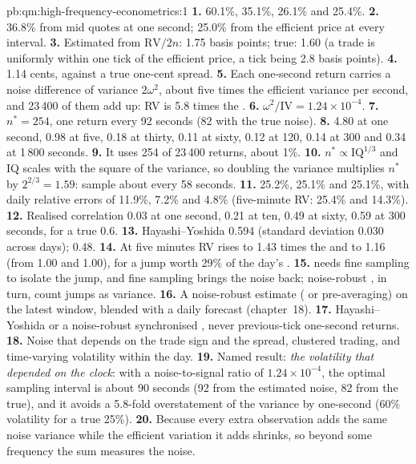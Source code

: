 \begin{solution}{pb:qm:high-frequency-econometrics:1}
\textbf{1.} 60.1\%, 35.1\%, 26.1\% and 25.4\%.
\textbf{2.} 36.8\% from mid quotes at one second; 25.0\% from the efficient price at every interval.
\textbf{3.} Estimated from $\mathrm{RV}/2n$: 1.75 basis points; true: 1.60 (a trade is uniformly within one tick of the efficient price, a tick being 2.8 basis points).
\textbf{4.} 1.14 cents, against a true one-cent spread.
\textbf{5.} Each one-second return carries a noise difference of variance $2\omega^2$, about five times the efficient variance per second, and 23\,400 of them add up: RV is 5.8 times
the .
\textbf{6.} $\omega^2/\mathrm{IV} = 1.24 \times 10^{-4}$.
\textbf{7.} $n^* = 254$, one return every 92 seconds (82 with the true noise).
\textbf{8.} 4.80 at one second, 0.98 at five, 0.18 at thirty, 0.11 at sixty, 0.12 at 120, 0.14 at 300 and 0.34 at 1\,800 seconds.
\textbf{9.} It uses 254 of 23\,400 returns, about 1\%.
\textbf{10.} $n^* \propto \mathrm{IQ}^{1/3}$ and IQ scales with the square of the variance, so doubling the variance multiplies $n^*$ by $2^{2/3} = 1.59$: sample about every 58 seconds.
\textbf{11.} 25.2\%, 25.1\% and 25.1\%, with daily relative errors of 11.9\%, 7.2\% and 4.8\% (five-minute RV: 25.4\% and 14.3\%).
\textbf{12.} Realised correlation 0.03 at one second, 0.21 at ten, 0.49 at sixty, 0.59 at 300 seconds, for a true 0.6.
\textbf{13.} Hayashi--Yoshida 0.594 (standard deviation 0.030 across days);  0.48.
\textbf{14.} At five minutes RV rises to 1.43 times the  and  to 1.16 (from 1.00 and 1.00), for a jump worth 29\% of the day's .
\textbf{15.}  needs fine sampling to isolate the jump, and fine sampling brings the noise back; noise-robust , in turn, count jumps as variance.
\textbf{16.} A noise-robust estimate ( or pre-averaging) on the latest window, blended with a daily forecast (chapter~18).
\textbf{17.} Hayashi--Yoshida or a noise-robust synchronised , never previous-tick one-second returns.
\textbf{18.} Noise that depends on the trade sign and the spread, clustered trading, and time-varying volatility within the day.
\textbf{19.} Named result: \emph{the volatility that depended on the clock}: with a noise-to-signal ratio of $1.24 \times 10^{-4}$, the optimal sampling interval is about 90 seconds (92
from the estimated noise, 82 from the true), and it avoids a 5.8-fold overstatement of the variance by one-second  (60\% volatility for a true 25\%).
\textbf{20.} Because every extra observation adds the same noise variance while the efficient variation it adds shrinks, so beyond some frequency the sum measures the noise.
\end{solution}

